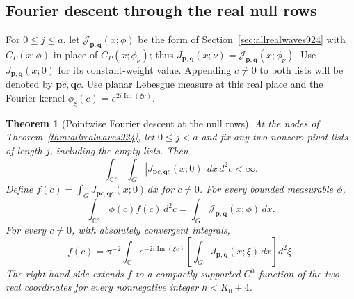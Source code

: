 \documentclass[a4paper,11pt]{article}
\newtheorem{theorem}[proposition]{Theorem}
\theoremstyle{definition}
\theoremstyle{remark}
\numberwithin{equation}{section}
\begin{document}
\subsection{Fourier descent through the real null rows}
\label{sec:realnulldescent926}

For \(0\le j\le a\), let \(\mathcal J_{\mathbf p,\mathbf q}(x;\phi)\)
be the form of Section~\ref{sec:allrealwaves924} with \(C_P(x;\phi)\)
in place of \(C_P(x;\phi_\nu)\); thus
\(J_{\mathbf p,\mathbf q}(x;\nu)=\mathcal J_{\mathbf p,\mathbf q}(x;\phi_\nu)\).
Use \(J_{\mathbf p,\mathbf q}(x;0)\) for its constant-weight value.
Appending \(c\ne0\) to both lists will be denoted by
\(\mathbf p c,\mathbf q c\). Use planar Lebesgue measure at this
real place and the Fourier kernel \(\phi_\xi(c)=e^{2i\operatorname{Im}(\xi c)}\).

\begin{theorem}[Pointwise Fourier descent at the null rows]
\leavevmode\label{thm:realnulldescent926}
At the nodes of Theorem~\ref{thm:allrealwaves924}, let \(0\le j<a\)
and fix any two nonzero pivot lists of length \(j\), including
the empty lists. Then
\[
  \int_{\mathbb C^\times}\int_G
       |J_{\mathbf p c,\mathbf q c}(x;0)|\,dx\,d^2c<\infty .
\]
Define \(f(c)=\int_G J_{\mathbf p c,\mathbf q c}(x;0)\,dx\)
for \(c\ne0\). For every bounded measurable \(\phi\),
\[
  \int_{\mathbb C^\times}\phi(c)f(c)\,d^2c
       =\int_G\mathcal J_{\mathbf p,\mathbf q}(x;\phi)\,dx.
\]
For every \(c\ne0\), with absolutely convergent integrals,
\begin{equation}
 f(c)=\pi^{-2}\int_{\mathbb C} e^{-2i\operatorname{Im}(\xi c)}
                 \left[\int_G J_{\mathbf p,\mathbf q}(x;\xi)\,dx\right]
                       d^2\xi .
 \label{eq:realnulldescent926}
\end{equation}
The right-hand side extends \(f\) to a compactly supported
\(C^h\) function of the two real coordinates for every nonnegative
integer \(h<K_0+4\).
\end{theorem}
\end{document}
